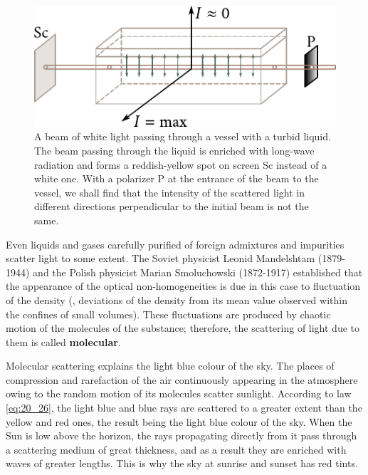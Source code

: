 \begin{figure}[t]
	\begin{center}
		\includegraphics[scale=1]{figures/ch_20/fig_20_10.pdf}
        \caption[]{A beam of white light passing through a vessel with a turbid liquid. The beam passing through the liquid is enriched with long-wave radiation and forms a reddish-yellow spot on screen Sc instead of a white one. With a polarizer P at the entrance of the beam to the vessel, we shall find that the intensity of the scattered light in different directions perpendicular to the initial beam is not the same.}
		\label{fig:20_10}
	\end{center}
	\vspace{-0.8cm}
\end{figure}

Even liquids and gases carefully purified of foreign admixtures and impurities scatter light to some extent.
The Soviet physicist Leonid Mandelshtam (1879-1944) and the Polish physicist Marian Smoluchowski (1872-1917) established that the appearance of the optical non-homogeneities is due in this case to fluctuation of the density (\ie, deviations of the density from its mean value observed within the confines of small volumes).
These fluctuations are produced by chaotic motion of the molecules of the substance; therefore, the scattering of light due to them is called \textbf{molecular}.

Molecular scattering explains the light blue colour of the sky.
The places of compression and rarefaction of the air continuously appearing in the atmosphere owing to the random motion of its molecules scatter sunlight.
According to law \eqref{eq:20_26}, the light blue and blue rays are scattered to a greater extent than the yellow and red ones, the result being the light blue colour of the sky.
When the Sun is low above the horizon, the rays propagating directly from it pass through a scattering medium of great thickness, and as a result they are enriched with waves of greater lengths.
This is why the sky at sunrise and sunset has red tints.

